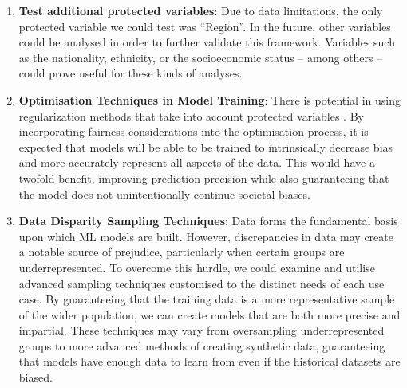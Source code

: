 \documentclass[fleqn,10pt]{wlscirep}
\begin{document}
\begin{enumerate}
    \item \textbf{Test additional protected variables}: Due to data limitations, the only protected variable we could test was ``Region''. In the future, other variables could be analysed in order to further validate this framework. Variables such as the nationality, ethnicity, or the socioeconomic status -- among others -- could prove useful for these kinds of analyses. 
    \item \textbf{Optimisation Techniques in Model Training}: There is potential in using regularization methods that take into account protected variables \cite{DBLP:journals/corr/abs-1910-11779}. By incorporating fairness considerations into the optimisation process, it is expected that models will be able to be trained to intrinsically decrease bias and more accurately represent all aspects of the data. This would have a twofold benefit, improving prediction precision while also guaranteeing that the model does not unintentionally continue societal biases.

    \item \textbf{Data Disparity Sampling Techniques}: Data forms the fundamental basis upon which ML models are built. However, discrepancies in data may create a notable source of prejudice, particularly when certain groups are underrepresented. To overcome this hurdle, we could examine and utilise advanced sampling techniques customised to the distinct needs of each use case. By guaranteeing that the training data is a more representative sample of the wider population, we can create models that are both more precise and impartial. These techniques may vary from oversampling underrepresented groups to more advanced methods of creating synthetic data, guaranteeing that models have enough data to learn from even if the historical datasets are biased.
    
\end{enumerate}
\end{document}
